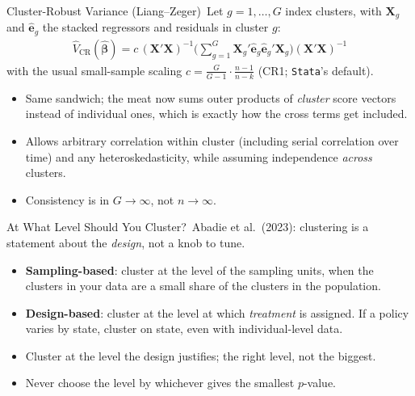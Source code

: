 \documentclass[aspectratio=169,11pt,xcolor=dvipsnames]{beamer}
\newcommand{\srct}[1]{#1}                               %
\newcommand{\X}{\bm{X}}
\newcommand{\bhat}{\hat{\bm{\beta}}}
\newcommand{\ehat}{\hat{\bm{e}}}
\newcommand{\adv}{\,\raisebox{0.6pt}{\textcolor{accent}{$\bigstar$}}}
\newcommand{\core}{\,\raisebox{0.6pt}{\textcolor{corestar}{$\bigstar$}}}
\begin{document}
\begin{frame}{Cluster-Robust Variance (Liang--Zeger)\adv}
Let $g = 1,\dots,G$ index clusters, with $\X_g$ and $\ehat_g$ the stacked
regressors and residuals in cluster $g$:
\begin{align*}
  \boxed{\;
  \hat{V}_{\text{CR}}(\bhat)
  = c\,(\X'\X)^{-1}
    \Big(\sum_{g=1}^{G} \X_g'\ehat_g\ehat_g'\X_g\Big)
    (\X'\X)^{-1} \;}
\end{align*}
with the usual small-sample scaling $c = \frac{G}{G-1}\cdot\frac{n-1}{n-k}$
(CR1; \texttt{Stata}'s default).
\vskip2pt
\begin{itemize}\itemsep2pt
  \item Same sandwich; the meat now sums outer products of \emph{cluster} score
        vectors instead of individual ones, which is exactly how the cross
        terms get included.
  \item Allows \alert{arbitrary} correlation within cluster (including serial
        correlation over time) and any heteroskedasticity, while assuming
        independence \emph{across} clusters.
  \item Consistency is in $G\to\infty$, not $n\to\infty$.
\end{itemize}
\end{frame}

\begin{frame}{At What Level Should You Cluster?\core}
\srct{Abadie et al.\ (2023)}: clustering is a statement about the \emph{design},
not a knob to tune.
\begin{itemize}\itemsep4pt
  \item \textbf{Sampling-based}: cluster at the level of the sampling units, when
        the clusters in your data are a small share of the clusters in the
        population.
  \item \textbf{Design-based}: cluster at the level at which \emph{treatment} is
        assigned. If a policy varies by state, cluster on state, even with
        individual-level data.
  \item Cluster at the level the design justifies; the right level, not
        the biggest.
  \item \alert{Never} choose the level by whichever gives the smallest $p$-value.
\end{itemize}
\end{frame}
\end{document}

